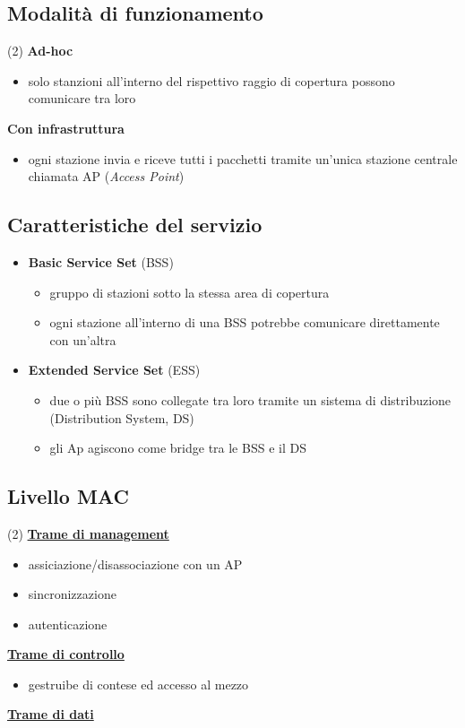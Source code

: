 \documentclass{book}
\begin{document}
\subsection{Modalità di funzionamento}
\begin{tasks} (2)
  \task \textbf{Ad-hoc}
  \begin{itemize}
  \item solo stanzioni all'interno del rispettivo raggio di copertura possono comunicare tra loro
  \end{itemize}
  \task \textbf{Con infrastruttura}
  \begin{itemize}
	\item ogni stazione invia e riceve tutti i pacchetti tramite un'unica stazione centrale chiamata AP (\textit{Access Point})
  \end{itemize}
\end{tasks}
\subsection{Caratteristiche del servizio}
\begin{itemize}
\item \textbf{Basic Service Set} (BSS)
  \begin{itemize}
  \item gruppo di stazioni sotto la stessa area di copertura
  \item ogni stazione all'interno di una BSS potrebbe comunicare direttamente con un'altra
  \end{itemize}
\item \textbf{Extended Service Set} (ESS)
  \begin{itemize}
  \item due o più BSS sono collegate tra loro tramite un sistema di distribuzione
    (Distribution System, DS)
  \item gli Ap agiscono come bridge tra le BSS e il DS
  \end{itemize}
\end{itemize}
\subsection{Livello MAC}
\begin{tasks} (2)
  \task \textbf{\underline{Trame di management}}
  \begin{itemize}
  \item assiciazione/disassociazione con un AP
  \item sincronizzazione
  \item autenticazione
  \end{itemize}
  \task \textbf{\underline{Trame di controllo}}
  \begin{itemize}
	\item gestruibe di contese ed accesso al mezzo
  \end{itemize}
  \task \textbf{\underline{Trame di dati}}      
\end{tasks}
\end{document}
